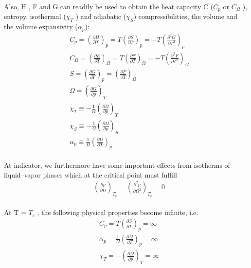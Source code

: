\documentclass[12pt]{article}
\newcommand*{\1}{\hspace{1pt}}
\begin{document}
            Also, H , F and G can readily be used to obtain the heat capacity C ($C_{p}$ or $C_{\Omega}$ ),
        entropy, isothermal ($\chi _{T}$ ) and adiabatic ($\chi _{S}$) compressibilities, the volume and the volume
        expansivity ($\alpha  _{p}$):\\

        \begin{align}
        &  C_{p} = \left(\frac{\partial H }{ \partial T}\right)_{p} = T \left(\frac{\partial S}{\partial T} \right) _{p} = -T \left(\frac{\partial ^2 G }{ \partial T^2}\right) _p \\
        & C_{\Omega} = \left(\frac{\partial E }{ \partial T}\right)_{\Omega} = T \left(\frac{\partial S}{\partial T} \right) _{\Omega} = -T \left(\frac{\partial ^2 F }{ \partial T^2}\right) _\Omega \\
        & S = \left(\frac{\partial G }{ \partial T}\right)_{p} =  \left(\frac{\partial F}{\partial T} \right) _{\Omega} \\
        & \Omega  = \left(\frac{\partial G }{ \partial p}\right)_{T} \\
        & \chi _T  \equiv  - \frac{1}{ \Omega} \left(\frac{\partial  \Omega }{ \partial p}\right)_{T} \\ 
        & \chi _S  \equiv  - \frac{1}{ \Omega} \left(\frac{\partial  \Omega }{ \partial p}\right)_{S} \\
        & \alpha  _p  \equiv  \frac{1}{ \Omega} \left(\frac{\partial  \Omega }{ \partial T}\right)_{p}  
        \end{align}\\

        At indicator, we furthermore have some important effects from isotherms of liquid–vapor phases which at the critical point must fulfill
        \begin{align}
        & \left(\frac{\partial p}{\partial \Omega} \right) _{T_{c}} = \left(\frac{\partial ^2 p}{\partial \Omega ^2} \right) _{T_{c}} =0
        \end{align}\\

        At T = $T_c$ , the following physical properties become infinite, i.e.\\


        \begin{align}
        & C_p = T \left(\frac{\partial S}{\partial T} \right) _p = \infty \\
        & \alpha _p = \frac{1}{\Omega} \left(\frac{\partial \Omega}{\partial T} \right) _p = \infty \\
        & \chi _T = -\left(\frac{\partial \Omega}{\partial p} \right) _T = \infty 
        \end{align}\\
\end{document}
